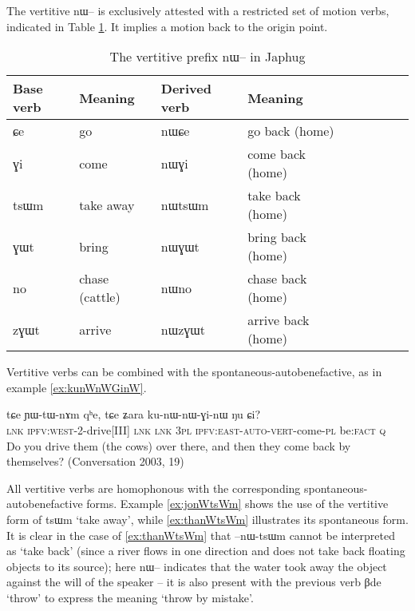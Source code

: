 \documentclass[oldfontcommands,oneside,a4paper,11pt]{article}
\newcommand{\ipa}[1]{{\phon \mbox{#1}}} %
\begin{document}
The vertitive \ipa{nɯ--}  is exclusively attested with a restricted set of motion verbs, indicated in Table \ref{tab:vertitive}. It implies a motion back to the origin point.
 
\begin{table}[h]
\caption{The vertitive prefix \ipa{nɯ--} in Japhug} \centering \label{tab:vertitive}
\begin{tabular}{lllllllll}
\toprule
Base verb & Meaning & Derived verb & Meaning& \\
\midrule
\ipa{ɕe} & go & \ipa{nɯɕe} & go back (home) & \\
\ipa{ɣi} & come & \ipa{nɯɣi} & come back (home)& \\
\ipa{tsɯm} & take away & \ipa{nɯtsɯm} & take back  (home)& \\
\ipa{ɣɯt} & bring & \ipa{nɯɣɯt} & bring back  (home)& \\
\ipa{no} & chase (cattle) & \ipa{nɯno} & chase back  (home)& \\
\ipa{zɣɯt} & arrive & \ipa{nɯzɣɯt} & arrive back (home)& \\
\bottomrule
\end{tabular}
\end{table}
Vertitive verbs can be combined with the spontaneous-autobenefactive, as in example \ref{ex:kunWnWGinW}. 


\begin{exe}
\ex \label{ex:kunWnWGinW}
\gll 
\ipa{tɕe}  	\ipa{ɲɯ-tɯ-nɤm}  	\ipa{qʰe,}  	\ipa{tɕe}  	\ipa{ʑara}  	\ipa{ku-nɯ-nɯ-ɣi-nɯ}  	\ipa{ŋu}  	\ipa{ɕi?}  \\
\textsc{lnk} \textsc{ipfv:west}-2-drive[III] \textsc{lnk} \textsc{lnk} \textsc{3pl} \textsc{ipfv:east}-\textsc{auto-vert}-come-\textsc{pl} be:\textsc{fact} \textsc{q} \\
\glt Do you drive them (the cows) over there, and then they come back by themselves? (Conversation 2003, 19)
\end{exe}

All vertitive verbs are homophonous with the corresponding spontaneous-autobenefactive forms. Example \ref{ex:jonWtsWm} shows the use of the vertitive form of \ipa{tsɯm} `take away', while \ref{ex:thanWtsWm} illustrates its spontaneous form. It is clear in the case of \ref{ex:thanWtsWm} that \ipa{--nɯ-tsɯm} cannot be interpreted as `take back' (since a river flows in one direction and does not take back floating objects to its source); here \ipa{nɯ--} indicates that the water took away the object against the will of the speaker -- it is also present with the previous verb \ipa{βde} `throw' to express the meaning `throw by mistake'.
\end{document}
